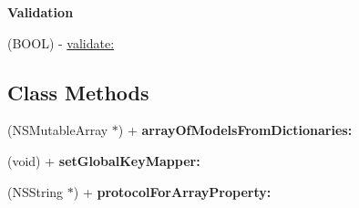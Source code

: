 \begin{Indent}\textbf{ Validation}\par
\begin{DoxyCompactItemize}
\item 
(B\+O\+OL) -\/ \mbox{\hyperlink{interface_o_p_t_l_y_j_s_o_n_model_a7f6a3cd6f85c5edc5cb2629bb651b26f}{validate\+:}}
\end{DoxyCompactItemize}
\end{Indent}
\subsection*{Class Methods}
\begin{DoxyCompactItemize}
\item 
\mbox{\label{interface_o_p_t_l_y_j_s_o_n_model_a37c10b6272f91bcb4d01d72b7889c009}} 
(N\+S\+Mutable\+Array $\ast$) + {\bfseries array\+Of\+Models\+From\+Dictionaries\+:}
\item 
\mbox{\label{interface_o_p_t_l_y_j_s_o_n_model_a9b85be790c03c2667ad4bff77489f8c4}} 
(void) + {\bfseries set\+Global\+Key\+Mapper\+:}
\item 
\mbox{\label{interface_o_p_t_l_y_j_s_o_n_model_a5928de9aac4847a452a4ef3d812fd6ff}} 
(N\+S\+String $\ast$) + {\bfseries protocol\+For\+Array\+Property\+:}
\end{DoxyCompactItemize}

